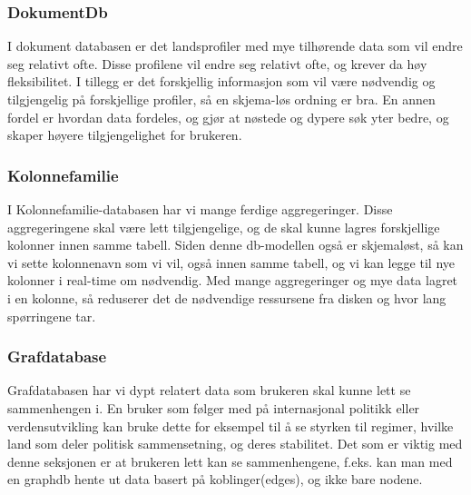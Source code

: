 \subsubsection{DokumentDb}
I dokument databasen er det landsprofiler med mye tilhørende data som vil endre seg relativt ofte. Disse profilene vil endre seg relativt ofte, og krever da høy fleksibilitet. I tillegg er det forskjellig informasjon som vil være nødvendig og tilgjengelig på forskjellige profiler, så en skjema-løs ordning er bra. En annen fordel er hvordan data fordeles, og gjør at nøstede og dypere søk yter bedre, og skaper høyere tilgjengelighet for brukeren.

\subsubsection{Kolonnefamilie}
I Kolonnefamilie-databasen har vi mange ferdige aggregeringer. Disse aggregeringene skal være lett tilgjengelige, og de skal kunne lagres forskjellige kolonner innen samme tabell. Siden denne db-modellen også er skjemaløst, så kan vi sette kolonnenavn som vi vil, også innen samme tabell, og vi kan legge til nye kolonner i real-time om nødvendig. Med mange aggregeringer og mye data lagret i en kolonne, så reduserer det de nødvendige ressursene fra disken og hvor lang spørringene tar.

\subsubsection{Grafdatabase}
Grafdatabasen har vi dypt relatert data som brukeren skal kunne lett se sammenhengen i. En bruker som følger med på internasjonal politikk eller verdensutvikling kan bruke dette for eksempel til å se styrken til regimer, hvilke land som deler politisk sammensetning, og deres stabilitet. Det som er viktig med denne seksjonen er at brukeren lett kan se sammenhengene, f.eks. kan man med en graphdb hente ut data basert på koblinger(edges), og ikke bare nodene.




